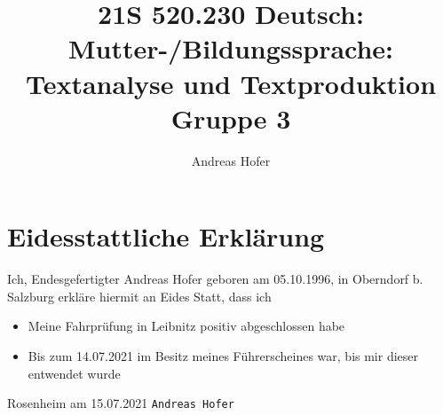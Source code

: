 \documentclass{article}
\title{\vspace{-3cm}21S 520.230 Deutsch: Mutter-/Bildungssprache: Textanalyse und Textproduktion Gruppe 3}
\author{Andreas Hofer}
\begin{document}
	\section*{Eidesstattliche Erklärung}
	Ich, Endesgefertigter Andreas Hofer geboren am 05.10.1996, in Oberndorf b. Salzburg erkläre hiermit an Eides Statt, dass ich
	\begin{itemize}
		\item{Meine Fahrprüfung in Leibnitz positiv abgeschlossen habe}
		\item{Bis zum 14.07.2021 im Besitz meines Führerscheines war, bis mir dieser entwendet wurde}
	\end{itemize}
	\vspace{10pt}
	Rosenheim am 15.07.2021 \hspace{8.5cm} \texttt{\small{Andreas Hofer}} \\
\end{document}
